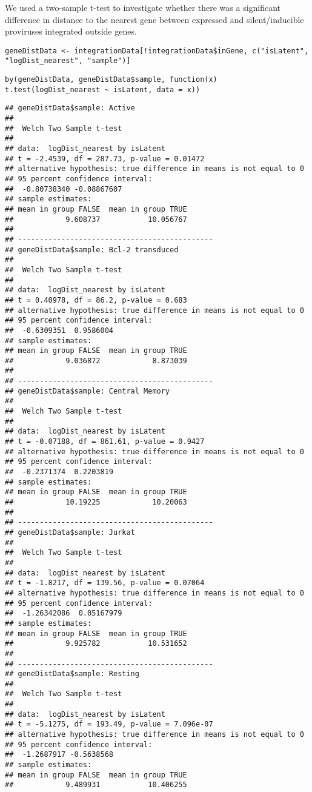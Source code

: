 \documentclass[../../sherrill-Mix_thesis.tex]{subfiles}
\makeatletter
\newenvironment{kframe}{%
 \def\at@end@of@kframe{}%
 \ifinner\ifhmode%
  \def\at@end@of@kframe{\end{minipage}}%
  \begin{minipage}{\columnwidth}%
 \fi\fi%
 \def\FrameCommand##1{\hskip\@totalleftmargin \hskip-\fboxsep
 \colorbox{shadecolor}{##1}\hskip-\fboxsep
     \hskip-\linewidth \hskip-\@totalleftmargin \hskip\columnwidth}%
 \MakeFramed {\advance\hsize-\width
   \@totalleftmargin\z@ \linewidth\hsize
   \@setminipage}}%
 {\par\unskip\endMakeFramed%
 \at@end@of@kframe}
\newenvironment{knitrout}{}{} %
\makeatother
\begin{document}
We used a two-sample t-test to investigate whether there was a significant difference in distance to the nearest gene between expressed and silent/inducible proviruses integrated outside genes.
\begin{knitrout}
\color{fgcolor}\begin{kframe}
\begin{lstlisting}[basicstyle=\ttfamily,breaklines=true]
geneDistData <- integrationData[!integrationData$inGene, c("isLatent", "logDist_nearest", "sample")]\end{lstlisting}
\begin{lstlisting}[basicstyle=\ttfamily,breaklines=true]
by(geneDistData, geneDistData$sample, function(x) t.test(logDist_nearest ~ isLatent, data = x))\end{lstlisting}
\begin{lstlisting}[basicstyle=\ttfamily,breaklines=true]
## geneDistData$sample: Active
## 
## 	Welch Two Sample t-test
## 
## data:  logDist_nearest by isLatent
## t = -2.4539, df = 287.73, p-value = 0.01472
## alternative hypothesis: true difference in means is not equal to 0
## 95 percent confidence interval:
##  -0.80738340 -0.08867607
## sample estimates:
## mean in group FALSE  mean in group TRUE 
##            9.608737           10.056767 
## 
## --------------------------------------------- 
## geneDistData$sample: Bcl-2 transduced
## 
## 	Welch Two Sample t-test
## 
## data:  logDist_nearest by isLatent
## t = 0.40978, df = 86.2, p-value = 0.683
## alternative hypothesis: true difference in means is not equal to 0
## 95 percent confidence interval:
##  -0.6309351  0.9586004
## sample estimates:
## mean in group FALSE  mean in group TRUE 
##            9.036872            8.873039 
## 
## --------------------------------------------- 
## geneDistData$sample: Central Memory
## 
## 	Welch Two Sample t-test
## 
## data:  logDist_nearest by isLatent
## t = -0.07188, df = 861.61, p-value = 0.9427
## alternative hypothesis: true difference in means is not equal to 0
## 95 percent confidence interval:
##  -0.2371374  0.2203819
## sample estimates:
## mean in group FALSE  mean in group TRUE 
##            10.19225            10.20063 
## 
## --------------------------------------------- 
## geneDistData$sample: Jurkat
## 
## 	Welch Two Sample t-test
## 
## data:  logDist_nearest by isLatent
## t = -1.8217, df = 139.56, p-value = 0.07064
## alternative hypothesis: true difference in means is not equal to 0
## 95 percent confidence interval:
##  -1.26342086  0.05167979
## sample estimates:
## mean in group FALSE  mean in group TRUE 
##            9.925782           10.531652 
## 
## --------------------------------------------- 
## geneDistData$sample: Resting
## 
## 	Welch Two Sample t-test
## 
## data:  logDist_nearest by isLatent
## t = -5.1275, df = 193.49, p-value = 7.096e-07
## alternative hypothesis: true difference in means is not equal to 0
## 95 percent confidence interval:
##  -1.2687917 -0.5638568
## sample estimates:
## mean in group FALSE  mean in group TRUE 
##            9.489931           10.406255
\end{lstlisting}
\end{kframe}
\end{knitrout}
\end{document}
